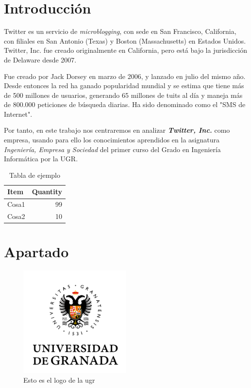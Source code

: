 \documentclass[12pt, spanish]{article}
\begin{document}

\tableofcontents
\pagebreak


\section{Introducción}

Twitter es un servicio de \textit{microblogging}, con sede en San Francisco, California, con filiales en San Antonio (Texas) y Boston (Massachusetts) en Estados Unidos. Twitter, Inc. fue creado originalmente en California, pero está bajo la jurisdicción de Delaware desde 2007. 

Fue creado por Jack Dorsey en marzo de 2006, y lanzado en julio del mismo año. Desde entonces la red ha ganado popularidad mundial y se estima que tiene más de 500 millones de usuarios, generando 65 millones de tuits al día y maneja más de 800.000 peticiones de búsqueda diarias. Ha sido denominado como el "SMS de Internet".

Por tanto, en este trabajo nos centraremos en analizar \textbf{\textit{Twitter, Inc.}} como empresa, usando para ello los conocimientos aprendidos en la asignatura \textit{Ingeniería, Empresa y Sociedad} del primer curso del Grado en Ingeniería Informática por la UGR.


\begin{table}[!htb]
\centering
\begin{tabular}{l|r}
Item & Quantity \\\hline
Cosa1 & 99 \\
Cosa2 & 10
\end{tabular}
\caption{\label{tab:widgets}Tabla de ejemplo}
\end{table}

\newpage

\section{Apartado}

\begin{figure}[!htb]
\centering
\includegraphics[width=0.5\textwidth]{ugr.png}
\caption{\label{fig:frog}Esto es el logo de la ugr}
\end{figure}

\newpage





\end{document}
